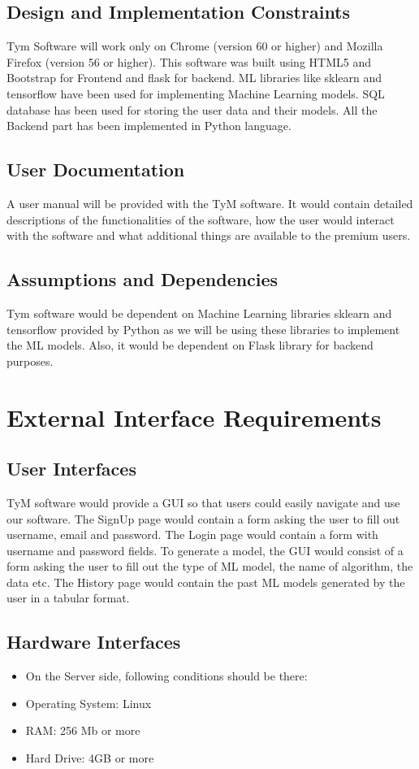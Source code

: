 \documentclass[12pt]{scrreprt}
\begin{document}
\section{Design and Implementation Constraints}
Tym Software will work only on Chrome (version 60 or higher) and Mozilla Firefox (version 56 or higher). This software was built using HTML5 and Bootstrap for Frontend and flask for backend. ML libraries like sklearn and tensorflow have been used for implementing Machine Learning models. SQL database has been used for storing the user data and their models. All the Backend part has been implemented in Python language.

\section{User Documentation}
A user manual will be provided with the TyM software. It would contain detailed descriptions of the functionalities of the software, how the user would interact with the software and what additional things are available to the premium users.

\section{Assumptions and Dependencies}
Tym software would be dependent on Machine Learning libraries sklearn and tensorflow provided by Python as we will be using these libraries to implement the ML models. Also, it would be dependent on Flask library for backend purposes.


\chapter{External Interface Requirements}

\section{User Interfaces}
TyM software would provide a GUI so that users could easily navigate and use our software. The SignUp page would contain a form asking the user to fill out username, email and password. The Login page would contain a form with username and password fields. To generate a model, the GUI would consist of a form asking the user to fill out the type of ML model, the name of algorithm, the data etc. The History page would contain the past ML models generated by the user in a tabular format. 

\section{Hardware Interfaces}
\begin{itemize}
\item On the Server side, following conditions should be there:
\item Operating System: Linux
\item RAM: 256 Mb or more
\item Hard Drive: 4GB or more
\end{itemize}
\end{document}

